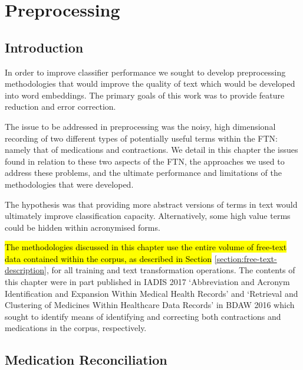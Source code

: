 
 \chapter{Preprocessing}
 \label{chpt-preprocessing}
 
 
 
 \section{Introduction}
 
In order to improve classifier performance we sought to develop preprocessing methodologies that would improve the quality of text which would be developed into word embeddings. The primary goals of this work was to provide feature reduction and error correction. 

The issue to be addressed in preprocessing was the noisy, high dimensional recording of two different types of potentially useful terms within the FTN: namely that of medications and contractions. We detail in this chapter the issues found in relation to these two aspects of the FTN, the approaches we used to address these problems, and the ultimate performance and limitations of the methodologies that were developed.



The hypothesis was that providing more abstract versions of terms in text would ultimately improve classification capacity. Alternatively, some high value terms could be hidden within acronymised forms. 

\hl{
The methodologies discussed in this chapter use the entire volume of free-text data contained within the corpus, as described in Section} \ref{section:free-text-description}, for all training and text transformation operations. The contents of this chapter were in part published in IADIS 2017 `Abbreviation and Acronym Identification and Expansion Within Medical Health Records' \cite{wallace2017abbreviation} and `Retrieval and Clustering of Medicines Within Healthcare Data Records' \cite{wallace2016retrieval} in BDAW 2016 which sought to identify means of identifying and correcting both contractions and medications in the corpus, respectively.

\section{Medication Reconciliation}
\label{section:medication-reconciliation}

